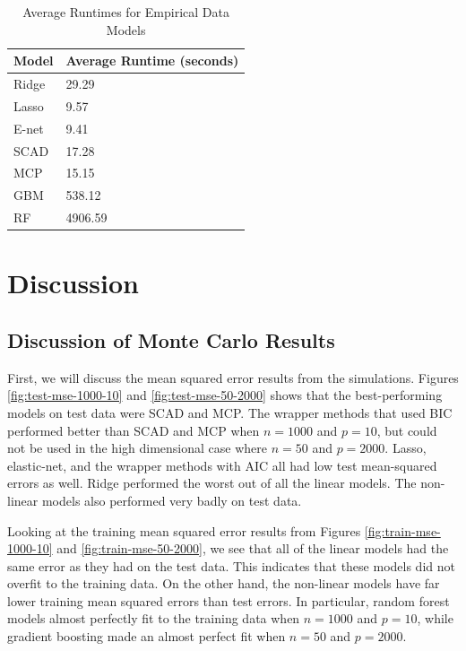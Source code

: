 \documentclass{article}
\begin{document}
\begin{table}[h!]
	\centering
	\caption{Average Runtimes for Empirical Data Models}
	\label{tab:emp_runtimes}
	\begin{tabular}{ll}
		\hline
		\textbf{Model}        & \textbf{Average Runtime} (seconds) \\ \hline
		Ridge         & 29.29               \\
		Lasso         & 9.57                \\
		E-net	      & 9.41                \\
		SCAD          & 17.28               \\
		MCP           & 15.15               \\
		GBM      	  & 538.12              \\
		RF 			  & 4906.59             \\ \hline
	\end{tabular}
\end{table}

\section{Discussion}\label{sec:discussion}
\subsection{Discussion of Monte Carlo Results}
First, we will discuss the mean squared error results from the simulations. Figures \ref{fig:test-mse-1000-10} and \ref{fig:test-mse-50-2000} shows that the best-performing models on test data were SCAD and MCP. The wrapper methods that used BIC performed better than SCAD and MCP when $n = 1000$ and $p = 10$, but could not be used in the high dimensional case where $n = 50$ and $p = 2000$. Lasso, elastic-net, and the wrapper methods with AIC all had low test mean-squared errors as well. Ridge performed the worst out of all the linear models. The non-linear models also performed very badly on test data.

Looking at the training mean squared error results from Figures \ref{fig:train-mse-1000-10} and \ref{fig:train-mse-50-2000}, we see that all of the linear models had the same error as they had on the test data. This indicates that these models did not overfit to the training data. On the other hand, the non-linear models have far lower training mean squared errors than test errors. In particular, random forest models almost perfectly fit to the training data when $n = 1000$ and $p = 10$, while gradient boosting made an almost perfect fit when $n = 50$ and $p = 2000$.
\end{document}
